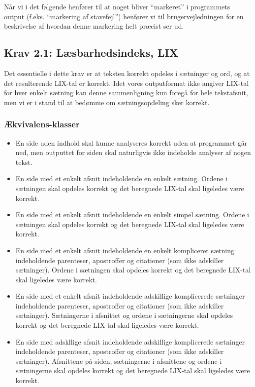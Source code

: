 \documentclass[a4paper,oneside,article]{memoir}
\begin{document}
Når vi i det følgende henfører til at noget bliver ``markeret'' i
programmets output (f.eks. ``markering af stavefejl'') henfører vi til
brugervejledningen for en beskrivelse af hvordan denne markering helt
præcist ser ud.

\subsection{Krav 2.1: Læsbarhedsindeks, LIX}

Det essentielle i dette krav er at teksten korrekt opdeles i sætninger
og ord, og at det resulterende LIX-tal er korrekt. Idet vores
outputformat ikke angiver LIX-tal for hver enkelt sætning kan denne
sammenligning kun foregå for hele tekstafsnit, men vi er i stand til
at bedømme om sætningsopdeling sker korrekt.

\subsubsection{Ækvivalens-klasser}
\begin{itemize}
\item En side uden indhold skal kunne analyseres korrekt uden at
  programmet går ned, men outputtet for siden skal naturligvis ikke
  indeholde analyser af nogen tekst.
\item En side med et enkelt afsnit indeholdende en enkelt
  sætning. Ordene i sætningen skal opdeles korrekt og det beregnede
  LIX-tal skal ligeledes være korrekt.
\item En side med et enkelt afsnit indeholdende en enkelt simpel
  sætning. Ordene i sætningen skal opdeles korrekt og det beregnede
  LIX-tal skal ligeledes være korrekt.
\item En side med et enkelt afsnit indeholdende en enkelt kompliceret
  sætning indeholdende parenteser, apostroffer og citationer (som ikke
  adskiller sætninger). Ordene i sætningen skal opdeles korrekt og det
  beregnede LIX-tal skal ligeledes være korrekt.
\item En side med et enkelt afsnit indeholdende adskillige
  komplicerede sætninger indeholdende parenteser, apostroffer og
  citationer (som ikke adskiller sætninger). Sætningerne i afsnittet
  og ordene i sætningerne skal opdeles korrekt og det beregnede
  LIX-tal skal ligeledes være korrekt.
\item En side med adskllige afsnit indeholdende adskillige
  komplicerede sætninger indeholdende parenteser, apostroffer og
  citationer (som ikke adskiller sætninger). Afsnittene på siden,
  sætningerne i afsnittene og ordene i sætningerne skal opdeles
  korrekt og det beregnede LIX-tal skal ligeledes være korrekt.
\end{itemize}
\end{document}
